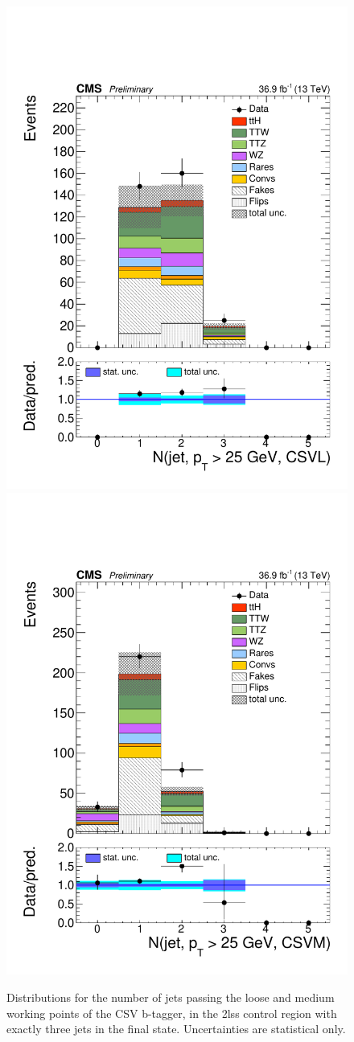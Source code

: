 \begin{figure}[!htb]
\centering
\includegraphics[width=0.35\linewidth]{plots_controlregions/cr_3j_data_frdata/nBJetLoose25.pdf}
\includegraphics[width=0.35\linewidth]{plots_controlregions/cr_3j_data_frdata/nBJetMedium25.pdf}\\
\caption{Distributions for the number of jets passing the loose and medium working points of the CSV b-tagger, in the 2lss control region with exactly three jets in the final state.
Uncertainties are statistical only.
}
\label{fig:cr_2lss_3j_2}
\end{figure}

